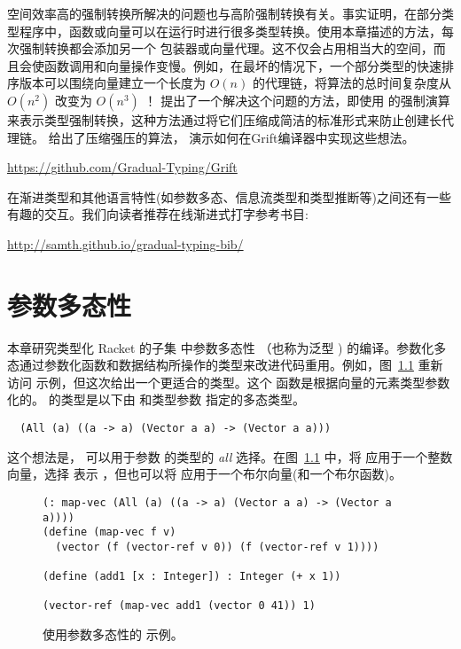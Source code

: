 \documentclass[11pt]{book}
\begin{document}
空间效率高的强制转换所解决的问题也与高阶强制转换有关。事实证明，在部分类型程序中，函数或向量可以在运行时进行很多类型转换。使用本章描述的方法，每次强制转换都会添加另一个
 包装器或向量代理。这不仅会占用相当大的空间，而且会使函数调用和向量操作变慢。例如，在最坏的情况下，一个部分类型的快速排序版本可以围绕向量建立一个长度为 $O(n)$
的代理链，将算法的总时间复杂度从 $O(n^2)$ 改变为 $O(n^3)$ ！\citet{Herman:2006uq} 提出了一个解决这个问题的方法，即使用 \citet{Henglein:1994nz} 的强制演算来表示类型强制转换，这种方法通过将它们压缩成简洁的标准形式来防止创建长代理链。 \citet{Siek:2015ab} 给出了压缩强压的算法， \citet{Kuhlenschmidt:2019aa} 演示如何在Grift编译器中实现这些想法。
\begin{center}
  \url{https://github.com/Gradual-Typing/Grift}
\end{center}

在渐进类型和其他语言特性(如参数多态、信息流类型和类型推断等)之间还有一些有趣的交互。我们向读者推荐在线渐进式打字参考书目:
\begin{center}
  \url{http://samth.github.io/gradual-typing-bib/}
\end{center}


\chapter{参数多态性}
\label{ch:Rpoly}

本章研究类型化 Racket 的子集 \LangPoly{}
中参数多态性 
（也称为泛型 ) 的编译。参数化多态通过参数化函数和数据结构所操作的类型来改进代码重用。例如，图~\ref{fig:map-vec-poly}
重新访问  示例，但这次给出一个更适合的类型。这个  函数是根据向量的元素类型参数化的。 
的类型是以下由  和类型参数  指定的多态类型。
\begin{lstlisting}
  (All (a) ((a -> a) (Vector a a) -> (Vector a a)))
\end{lstlisting}
这个想法是，  可以用于参数  的类型的 \emph{all} 选择。在图~\ref{fig:map-vec-poly} 中，将
 应用于一个整数向量，选择  表示
 ，但也可以将  应用于一个布尔向量(和一个布尔函数)。

\begin{figure}[tbp]
\begin{lstlisting}
(: map-vec (All (a) ((a -> a) (Vector a a) -> (Vector a a))))
(define (map-vec f v)
  (vector (f (vector-ref v 0)) (f (vector-ref v 1))))

(define (add1 [x : Integer]) : Integer (+ x 1))

(vector-ref (map-vec add1 (vector 0 41)) 1)
\end{lstlisting}
\caption{使用参数多态性的  示例。}
\label{fig:map-vec-poly}
\end{figure}
\end{document}
